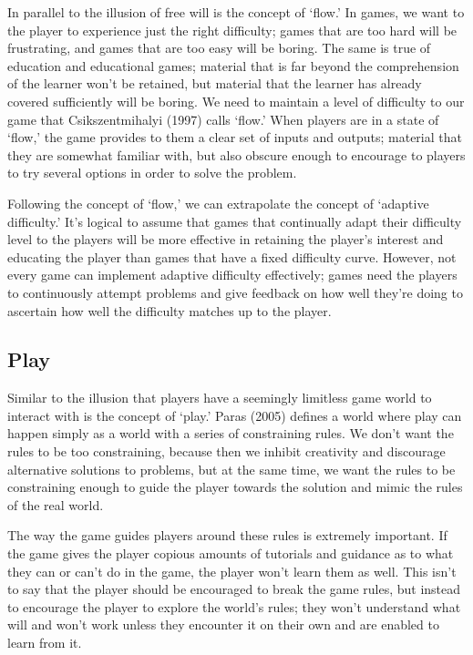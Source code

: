 \documentclass[12pt]{report}
\begin{document}
		In parallel to the illusion of free will is the concept of ‘flow.' In games, we want to the player to experience just the right difficulty; games that are too hard will be frustrating, and games that are too easy will be boring. The same is true of education and educational games; material that is far beyond the comprehension of the learner won't be retained, but material that the learner has already covered sufficiently will be boring. We need to maintain a level of difficulty to our game that Csikszentmihalyi (1997) calls ‘flow.' When players are in a state of ‘flow,' the game provides to them a clear set of inputs and outputs; material that they are somewhat familiar with, but also obscure enough to encourage to players to try several options in order to solve the problem.

		Following the concept of ‘flow,' we can extrapolate the concept of ‘adaptive difficulty.' It's logical to assume that games that continually adapt their difficulty level to the players will be more effective in retaining the player's interest and educating the player than games that have a fixed difficulty curve. However, not every game can implement adaptive difficulty effectively; games need the players to continuously attempt problems and give feedback on how well they're doing to ascertain how well the difficulty matches up to the player.

	\subsection{Play}
		Similar to the illusion that players have a seemingly limitless game world to interact with is the concept of ‘play.' Paras (2005) defines a world where play can happen simply as a world with a series of constraining rules. We don't want the rules to be too constraining, because then we inhibit creativity and discourage alternative solutions to problems, but at the same time, we want the rules to be constraining enough to guide the player towards the solution and mimic the rules of the real world.
		
		The way the game guides players around these rules is extremely important. If the game gives the player copious amounts of tutorials and guidance as to what they can or can't do in the game, the player won't learn them as well. This isn't to say that the player should be encouraged to break the game rules, but instead to encourage the player to explore the world's rules; they won't understand what will and won't work unless they encounter it on their own and are enabled to learn from it.
	
\end{document}

